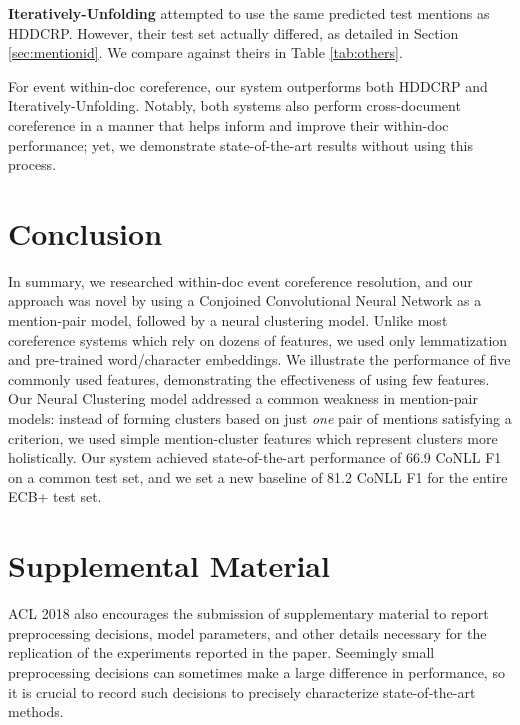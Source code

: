 \documentclass[11pt,a4paper]{article}
\begin{document}
\textbf{Iteratively-Unfolding} attempted to use the same predicted test mentions as HDDCRP.  However, their test set actually differed, as detailed in Section \ref{sec:mentionid}.  We compare against theirs in Table \ref{tab:others}.

For event within-doc coreference, our system outperforms both HDDCRP and Iteratively-Unfolding.  Notably, both systems also perform cross-document coreference in a manner that helps inform and improve their within-doc performance; yet, we demonstrate state-of-the-art results without using this process.


\section{Conclusion}
In summary, we researched within-doc event coreference resolution, and our approach was novel by using a Conjoined Convolutional Neural Network as a mention-pair model, followed by a neural clustering model.  Unlike most coreference systems which rely on dozens of features, we used only lemmatization and pre-trained word/character embeddings.  We illustrate the performance of five commonly used features, demonstrating the effectiveness of using few features.  Our Neural Clustering model addressed a common weakness in mention-pair models: instead of forming clusters based on just \textit{one} pair of mentions satisfying a criterion, we used simple mention-cluster features which represent clusters more holistically.  Our system achieved state-of-the-art performance of 66.9 CoNLL F1 on a common test set, and we set a new baseline of 81.2 CoNLL F1 for the entire ECB+ test set.   

%
%



\appendix
\section{Supplemental Material}
\label{sec:supplemental}
ACL 2018 also encourages the submission of supplementary material
to report preprocessing decisions, model parameters, and other details
necessary for the replication of the experiments reported in the 
paper. Seemingly small preprocessing decisions can sometimes make
a large difference in performance, so it is crucial to record such
decisions to precisely characterize state-of-the-art methods.
\end{document}
